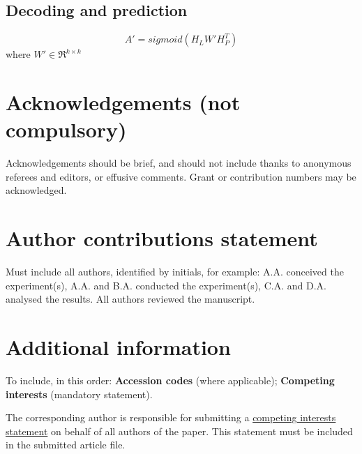 \documentclass[fleqn,10pt]{wlscirep}
\begin{document}
\subsection*{Decoding and prediction}

\begin{equation}
A' = sigmoid({H_L}W'H_P^T)
\end{equation}
where $W' \in {\Re ^{k \times k}}$





\section*{Acknowledgements (not compulsory)}

Acknowledgements should be brief, and should not include thanks to anonymous referees and editors, or effusive comments. Grant or contribution numbers may be acknowledged.

\section*{Author contributions statement}

Must include all authors, identified by initials, for example:
A.A. conceived the experiment(s),  A.A. and B.A. conducted the experiment(s), C.A. and D.A. analysed the results.  All authors reviewed the manuscript. 

\section*{Additional information}

To include, in this order: \textbf{Accession codes} (where applicable); \textbf{Competing interests} (mandatory statement). 

The corresponding author is responsible for submitting a \href{http://www.nature.com/srep/policies/index.html#competing}{competing interests statement} on behalf of all authors of the paper. This statement must be included in the submitted article file.
\end{document}
